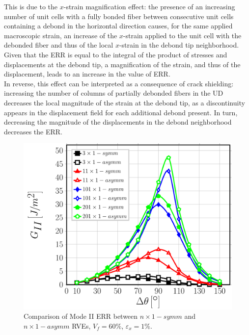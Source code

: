 This is due to the $x$-strain magnification effect: the presence of an increasing number of unit cells with a fully bonded fiber between consecutive unit cells containing a debond in the horizontal direction causes, for the same applied macroscopic strain, an increase of the $x$-strain applied to the unit cell with the debonded fiber and thus of the local $x$-strain in the debond tip neighborhood. Given that the ERR is equal to the integral of the product of stresses and displacements at the debond tip, a magnification of the strain, and thus of the displacement, leads to an increase in the value of ERR.\\
In reverse, this effect can be interpreted as a consequence of crack shielding: increasing the number of columns of partially debonded fibers in the UD decreases the local magnitude of the strain at the debond tip, as a discontinuity appears in the displacement field for each additional debond present. In turn, decreasing the magnitude of the displacements in the debond neighborhood decreases the ERR.

\begin{figure}[!htb]
\centering
  \includegraphics[width=\textwidth]{paperD/nx1-coupling-vf60-GII.pdf}
\caption{Comparison of Mode II ERR between $n \times 1−symm$ and $n \times 1−asymm$ RVEs, $V_{f}=60\%$, $\varepsilon_{x}=1\%$.}\label{paperD:fig:nx1-GII}
\end{figure}


